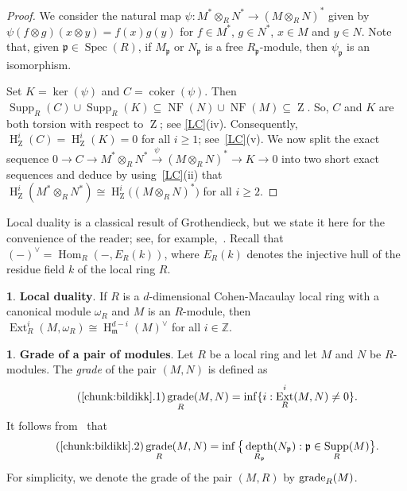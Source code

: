 \documentclass[11pt]{amsart}
\theoremstyle{definition}
\theoremstyle{definition}
\newtheorem{chunk}[thm]{\hspace*{-1.065ex}\bf}
\numberwithin{equation}{section}
\newcommand{\fm}{\mathfrak{m}}
\newcommand{\fp}{\mathfrak{p}}
\newcommand{\ZZ}{\mathbb{Z}}
\DeclareMathOperator{\gr}{\textnormal{grade}}
\DeclareMathOperator{\mz}{Z}
\DeclareMathOperator{\coker}{coker}
\DeclareMathOperator{\depth}{depth}
\DeclareMathOperator{\Ext}{Ext}
\DeclareMathOperator{\hh}{H}
\DeclareMathOperator{\Hom}{Hom}
\DeclareMathOperator{\Supp}{Supp}
\DeclareMathOperator{\Spec}{Spec}
\DeclareMathOperator{\NF}{NF}
\begin{document}
\begin{proof} We consider the natural map $\psi:M^{\ast}\otimes_RN^{\ast}\to(M\otimes_RN)^{\ast}$ given by $\psi(f\otimes g)(x\otimes y)=f(x)g(y)$ for $f\in M^{\ast}$, $g\in N^{\ast}$, $x\in M$ and $y\in N$. Note that, given $\fp \in \Spec(R)$, if $M_{\fp}$ or $N_{\fp}$ is a free $R_{\fp}$-module, then $\psi_{\fp}$ is an isomorphism.

Set $K=\ker(\psi)$ and $C=\coker(\psi)$. Then $\Supp_R(C) \cup \Supp_R(K) \subseteq \NF(N)\cup\NF(M)\subseteq\mz$. So, $C$ and $K$ are both torsion with respect to $\mz$; see \ref{LC}(iv). Consequently, $\hh_{\mz}^i(C)=\hh_{\mz}^i(K)=0$ for all $i\geq 1$; see~\ref{LC}(v). We now split the exact sequence $0 \to C \to M^{\ast} \otimes_RN^{\ast} \overset{\psi}{\longrightarrow} (M\otimes_RN)^{\ast} \to K \to 0$ into two short exact sequences and deduce by using~\ref{LC}(ii) that $\hh_{\mz}^i(M^\ast\otimes_RN^\ast)\cong \hh_{\mz}^i\big((M\otimes_RN)^\ast\big)$ for all $i\geq 2$. 	
\end{proof}

Local duality is a classical result of Grothendieck, but we state it here for the convenience of the reader; see, for example,~\cite[3.5.8]{BH}. Recall that $(-)^{\vee}=\Hom_R(-,E_R(k))$, where $E_R(k)$ denotes the injective hull of the residue field $k$ of the local ring $R$.

\begin{chunk} \textbf{Local duality}. \label{Ld} If $R$ is a $d$-dimensional Cohen-Macaulay local ring with a canonical module $\omega_R$ and $M$ is an $R$-module, then $\Ext^{i}_R(M,\omega_R) \cong \hh^{d-i}_{\fm}(M)^{\vee}$ for all $i\in \ZZ$.
\end{chunk}

\begin{chunk}\textbf{Grade of a pair of modules}.  \label{chunk:bildikk}
Let $R$ be a local ring and let $M$ and $N$ be $R$-modules. The \emph{grade} of the pair $(M,N)$ is defined as 
\begin{equation}\label{eq:bildikk1}\tag{\ref*{chunk:bildikk}.1}
\gr_R(M,N)=\inf\{i: \Ext^i_R(M,N)\neq 0\}.
\end{equation}
It follows from~\cite[4.5]{AuBr} that 
\begin{equation}\label{eq:bildikk2}\tag{\ref*{chunk:bildikk}.2}
\gr_R(M,N)=\inf\big \{\depth_{R_{\fp}}(N_\fp) : \fp\in\Supp_R(M)\big\}.
\end{equation}
For simplicity, we denote  the grade of the pair $(M,R)$ by $\gr_R(M)$.
\end{chunk}
\end{document}
